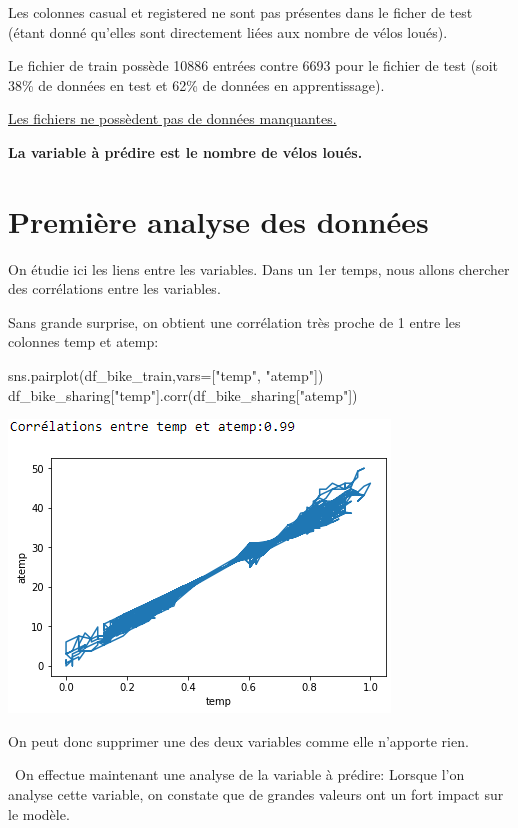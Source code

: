 \documentclass[a4paper,oneside,11pt]{article}
\begin{document}
Les colonnes casual et registered ne sont pas présentes dans le ficher de test (étant donné qu'elles sont directement liées aux nombre de vélos loués).

Le fichier de train possède 10886 entrées contre 6693 pour le fichier de test (soit 38\% de données en test et 62\% de données en apprentissage).

\underline{Les fichiers ne possèdent pas de données manquantes.}

\textbf{La variable à prédire est le nombre de vélos loués.}

\section*{Première analyse des données}
%

\qquad On étudie ici les liens entre les variables. Dans un 1er temps, nous allons chercher des corrélations entre les variables.

Sans grande surprise, on obtient une corrélation très proche de 1 entre les colonnes temp et atemp:
\begin{code-Python}
sns.pairplot(df_bike_train,vars=["temp", "atemp"])
df_bike_sharing["temp"].corr(df_bike_sharing["atemp"])
\end{code-Python}

\includegraphics{image_rapport/correl_temp_atemp}

On peut donc supprimer une des deux variables comme elle n'apporte rien.


\ On effectue maintenant une analyse de la variable à prédire: \newline
Lorsque l'on analyse cette variable, on constate que de grandes valeurs ont un fort impact sur le modèle.
\end{document}
